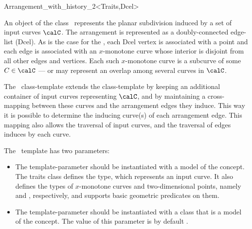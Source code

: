 
\ccRefPageBegin

\begin{ccRefClass}{Arrangement_with_history_2<Traits,Dcel>}
\label{arr_ref:arr_with_hist}
    
\ccDefinition

An object  of the class \ccClassTemplateName\ represents the
planar subdivision induced by a set of input curves $\calC$.
The arrangement is represented as a doubly-connected edge-list ({\sc Dcel}).
As is the case for the , each {\sc Dcel}
vertex is associated with a point and each edge is associated with an
$x$-monotone curve whose interior is disjoint from all other edges and
vertices. Each such $x$-monotone curve is a subcurve of some 
$C \in \calC$ --- or may represent an overlap among several curves
in $\calC$.

The \ccClassTemplateName\ class-template extends the 
class-template by keeping an additional container of input curves 
representing $\calC$, and by maintaining a cross-mapping between these
curves and the arrangement edges they induce. This way it is possible
to determine the inducing curve(s) of each arrangement edge. This mapping 
also allows the traversal of input curves, and the traversal of edges
induces by each curve.

The \ccClassTemplateName\ template has two parameters:
\begin{itemize}
\item The  template-parameter should be instantiated with
a model of the  concept. The traits
class defines the  type, which represents an input curve.
It also defines the types of $x$-monotone curves and two-dimensional
points, namely  and ,
respectively, and supports basic geometric predicates on them.
\item The  template-parameter should be instantiated with
a class that is a model of the  concept. The
value of this parameter is by default
.
\end{itemize}


\end{ccRefClass}
